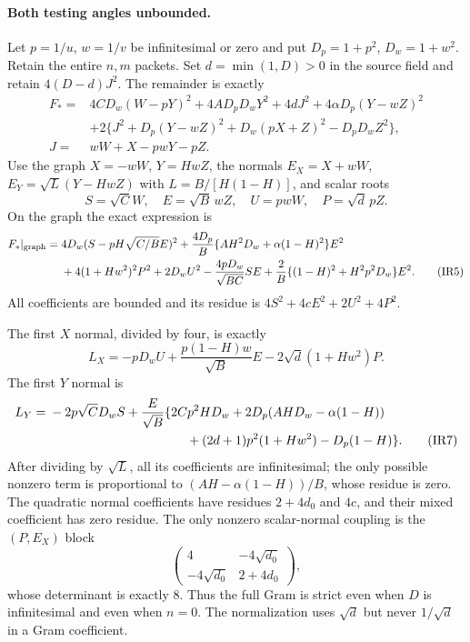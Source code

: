 \paragraph{Both testing angles unbounded.}
Let $p=1/u$, $w=1/v$ be infinitesimal or zero and put
$D_p=1+p^2$, $D_w=1+w^2$.
Retain the entire $n,m$ packets. Set $d=\min(1,D)>0$ in the source
field and retain $4(D-d)J^2$. The remainder is exactly
\begin{align*}
 F_*={}&4CD_w(W-pY)^2+4AD_pD_wY^2+4dJ^2
       +4\alpha D_p(Y-wZ)^2\\
 &+2\{J^2+D_p(Y-wZ)^2+D_w(pX+Z)^2-D_pD_wZ^2\},\\
 J={}&wW+X-pwY-pZ.
\end{align*}
Use the graph $X=-wW$, $Y=HwZ$, the normals
$E_X=X+wW$, $E_Y=\sqrt L(Y-HwZ)$ with
$L=B/[H(1-H)]$, and scalar roots
\[
 S=\sqrt C W,\quad E=\sqrt B\,wZ,\quad
 U=pwW,\quad P=\sqrt d\,pZ.
\tag{IR4}
\]
On the graph the exact expression is
\begin{align*}
 F_*|_{\rm graph}={}&4D_w(S-pH\sqrt{C/B}E)^2
 +\frac{4D_p}{B}\{AH^2D_w+\alpha(1-H)^2\}E^2\\
 &+4(1+Hw^2)^2P^2+2D_wU^2
 -\frac{4pD_w}{\sqrt{BC}}SE
 +\frac2B\{(1-H)^2+H^2p^2D_w\}E^2.
\tag{IR5}
\end{align*}
All coefficients are bounded and its residue is
$4S^2+4cE^2+2U^2+4P^2$.

The first $X$ normal, divided by four, is exactly
\[
 L_X=-pD_wU+\frac{p(1-H)w}{\sqrt B}E
               -2\sqrt d(1+Hw^2)P.
\tag{IR6}
\]
The first $Y$ normal is
\begin{align*}
 L_Y={}&-2p\sqrt C D_w S+\frac{E}{\sqrt B}
 \{2Cp^2HD_w+2D_p(AHD_w-\alpha(1-H))\\
 &\hspace{38mm}+(2d+1)p^2(1+Hw^2)-D_p(1-H)\}.
\tag{IR7}
\end{align*}
After dividing by $\sqrt L$, all its coefficients are infinitesimal;
the only possible nonzero term is proportional to
$(AH-\alpha(1-H))/B$, whose residue is zero.
The quadratic normal coefficients have residues
$2+4d_0$ and $4c$, and their mixed coefficient has zero residue.
The only nonzero scalar-normal coupling is the $(P,E_X)$ block
\[
 \begin{pmatrix}4&-4\sqrt{d_0}\\-4\sqrt{d_0}&2+4d_0\end{pmatrix},
\tag{IR8}
\]
whose determinant is exactly $8$. Thus the full Gram is strict even
when $D$ is infinitesimal and even when $n=0$. The normalization uses
$\sqrt d$ but never $1/\sqrt d$ in a Gram coefficient.

